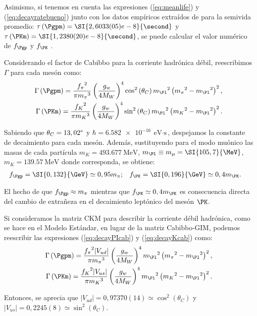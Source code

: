 Asimismo, si tenemos en cuenta las expresiones (\ref{eq:meanlife}) y (\ref{eq:decayratebueno}) junto con los datos empíricos extraídos de \cite{Zyla} para la semivida promedio: $\tau \left(\Pgpm\right)=\SI{2,6033(05)e-8}{\second}$ y $\tau \left(\PKm\right)=\SI{1,2380(20)e-8}{\second}$, se puede calcular el valor numérico de $f_{\Pgp}$ y $f_{\PK}$ \cite{Renton}. 

Considerando el factor de Cabibbo para la corriente hadrónica débil, reescribimos $\Gamma$ para cada mesón como:
\begin{align}
\Gamma\left(\Pgpm \right) =\dfrac{{f_{\pi}}^{2}}{\pi {m_{\pi}}^{3}}\left( \dfrac{g_w}{4M_W}\right)^{4} \cos^{2} \left(\theta_{C}\right)  {m_{\Pl}}^{2}\left({m_{\pi}}^{2}-{m_{\Pl}}^{2}\right)^{2} ,\label{eq:decayPIcab} \\
\Gamma\left(\PKm \right) =\dfrac{{f_{K}}^{2}}{\pi {m_{K}}^{3}}\left(\dfrac{g_w}{4M_W}\right)^{4} \sin^{2} \left(\theta_{C}\right) {m_{\Pl}}^{2}\left({m_{K}}^{2}-{m_{\Pl}}^{2}\right)^{2} .\label{eq:decayKcab}
\end{align}

Sabiendo que $\theta_{C}=13,02\degree$ y $\hbar=\SI{6,582e-16}{\eV\cdot\second}$, despejamos la constante de decaimiento para cada mesón. Además, sustituyendo para el modo muónico las masas de cada partícula $m_{K}=\SI{493,677}{\MeV}$, $m_{\Pl} \equiv m_{\mu}=\SI{105,7}{\MeV}$, $m_{K}=\SI{139,57}{\MeV}$ donde corresponda, se obtiene:
\begin{align}
f_{\Pgp} &= \SI{0,132}{\GeV} \simeq 0,95m_{\pi} ; & f_{\PK} &= \SI{0,196}{\GeV} \simeq 0,4m_{\PK} .
\end{align}

El hecho de que $f_{\Pgp} \approx m_{\pi}$ mientras que $f_{\PK} \simeq 0,4m_{\PK}$  es consecuencia directa del cambio de extrañeza en el decaimiento leptónico del mesón $\PK$. 

Si consideramos la matriz CKM para describir la corriente débil hadrónica, como se hace en el Modelo Estándar, en lugar de la matriz Cabibbo-GIM, podemos reescribir las expresiones (\ref{eq:decayPIcab}) y (\ref{eq:decayKcab}) como:
\begin{align}
\Gamma\left(\Pgpm \right) =\dfrac{{f_{\pi}}^{2}|V_{ud}|}{\pi {m_{\pi}}^{3}}\left( \dfrac{g_w}{4M_W}\right)^{4} {m_{\Pl}}^{2}\left({m_{\pi}}^{2}-{m_{\Pl}}^{2}\right)^{2},\label{eq:decayPIckm}\\
\Gamma\left(\PKm \right) =\dfrac{{f_{K}}^{2}|V_{us}|}{\pi {m_{K}}^{3}}\left(\dfrac{g_w}{4M_W}\right)^{4} {m_{\Pl}}^{2}\left({m_{K}}^{2}-{m_{\Pl}}^{2}\right)^{2}.\label{eq:decayKckm}
\end{align}

Entonces, se aprecia que $|V_{ud}|= 0,97370(14) \simeq \cos^{2} \left(\theta_{C}\right)$ y $|V_{us}|= 0,2245(8) \simeq \sin^{2} \left(\theta_{C}\right)$\protect\footnotemark .

